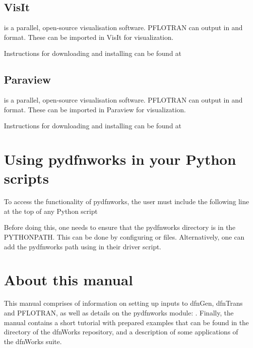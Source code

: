\documentclass[letterpaper,10pt,english]{sphinxmanual}
\begin{document}
\subsection{VisIt}
\label{\detokenize{intro:id4}}\label{\detokenize{intro:visit}}
 is a parallel, open-source visualisation software. PFLOTRAN can output
in  and  format. These can be imported in VisIt for visualization.

Instructions for downloading and installing  can be found at


\subsection{Paraview}
\label{\detokenize{intro:id5}}\label{\detokenize{intro:paraview}}
 is a parallel, open-source visualisation software. PFLOTRAN can
output in  and  format. These can be imported in Paraview
for visualization.

Instructions for downloading and installing  can be found at


\section{Using pydfnworks in your Python scripts}
\label{\detokenize{intro:id6}}\label{\detokenize{intro:using-pydfnworks-in-your-python-scripts}}
To access the functionality of pydfnworks, the user must include the
following line at the
top of any Python script

%
\begin{sphinxVerbatim}[commandchars=\\\{\}]
 
\end{sphinxVerbatim}

Before doing this, one needs to ensure that the pydfnworks directory is in the
PYTHONPATH. This can be done by configuring  or  files.
Alternatively, one can add the pydfnworks path using 
in their driver script.


\section{About this  manual}
\label{\detokenize{intro:about-this-manual}}
This manual comprises of information on setting up inputs to dfnGen, dfnTrans
and PFLOTRAN, as well as details on the pydfnworks module: {\hyperref[\detokenize{pydfnworks:dfnworks-python-chapter}]{}}. Finally, the manual contains a short tutorial
with prepared examples that  can be found in the  directory of the
dfnWorks repository, and a description of some applications of the dfnWorks
suite.
\end{document}
